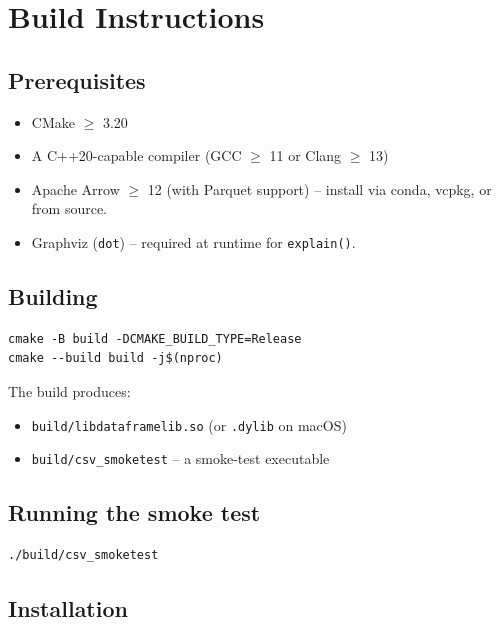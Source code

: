 \documentclass[12pt,a4paper]{article}
\begin{document}
\section{Build Instructions}

\subsection{Prerequisites}

\begin{itemize}[leftmargin=1.5em]
  \item CMake $\ge$ 3.20
  \item A C++20-capable compiler (GCC $\ge$ 11 or Clang $\ge$ 13)
  \item Apache Arrow $\ge$ 12 (with Parquet support) -- install via
        conda, vcpkg, or from source.
  \item Graphviz (\texttt{dot}) -- required at runtime for
        \texttt{explain()}.
\end{itemize}

\subsection{Building}

\begin{verbatim}
cmake -B build -DCMAKE_BUILD_TYPE=Release
cmake --build build -j$(nproc)
\end{verbatim}

The build produces:
\begin{itemize}[leftmargin=1.5em]
  \item \texttt{build/libdataframelib.so} (or \texttt{.dylib} on macOS)
  \item \texttt{build/csv\_smoketest} -- a smoke-test executable
\end{itemize}

\subsection{Running the smoke test}

\begin{verbatim}
./build/csv_smoketest
\end{verbatim}

\subsection{Installation}
\end{document}
